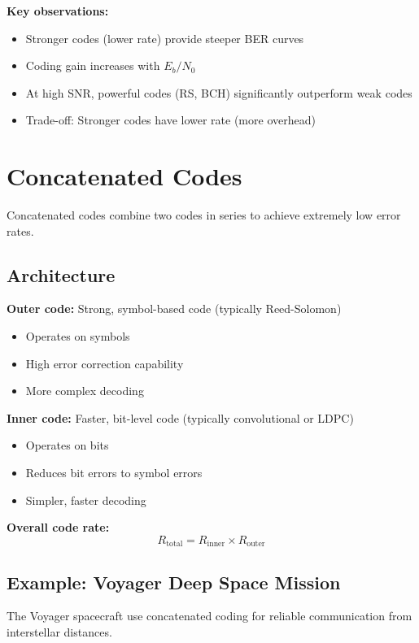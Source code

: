 \textbf{Key observations:}
\begin{itemize}
\item Stronger codes (lower rate) provide steeper BER curves
\item Coding gain increases with $E_b/N_0$
\item At high SNR, powerful codes (RS, BCH) significantly outperform weak codes
\item Trade-off: Stronger codes have lower rate (more overhead)
\end{itemize}

\section{Concatenated Codes}\label{concatenated-codes}

Concatenated codes combine two codes in series to achieve extremely low error rates.

\subsection{Architecture}

\textbf{Outer code:} Strong, symbol-based code (typically Reed-Solomon)
\begin{itemize}
\item Operates on symbols
\item High error correction capability
\item More complex decoding
\end{itemize}

\textbf{Inner code:} Faster, bit-level code (typically convolutional or LDPC)
\begin{itemize}
\item Operates on bits
\item Reduces bit errors to symbol errors
\item Simpler, faster decoding
\end{itemize}

\textbf{Overall code rate:}
\begin{equation}
R_{\text{total}} = R_{\text{inner}} \times R_{\text{outer}}
\end{equation}

\subsection{Example: Voyager Deep Space Mission}

The Voyager spacecraft use concatenated coding for reliable communication from interstellar distances.

